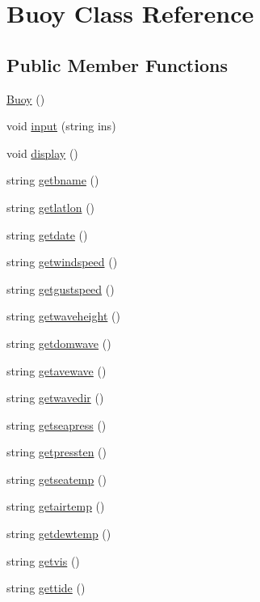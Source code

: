 \hypertarget{class_buoy}{}\section{Buoy Class Reference}
\label{class_buoy}
\subsection*{Public Member Functions}
\begin{DoxyCompactItemize}
\item 
\mbox{\hyperlink{class_buoy_aa6aa319139546405b1590e2ef8a292ae}{Buoy}} ()
\item 
void \mbox{\hyperlink{class_buoy_adebcdc47416100216797efc05dda77a3}{input}} (string ins)
\item 
void \mbox{\hyperlink{class_buoy_a9e5167e5f0967ee99f03ba223236b2d4}{display}} ()
\item 
string \mbox{\hyperlink{class_buoy_a70a9f0c2ed761cb6652de7f5b4d51e8c}{getbname}} ()
\item 
string \mbox{\hyperlink{class_buoy_ace0fbd097bbdd61b32d46e524b93f2eb}{getlatlon}} ()
\item 
string \mbox{\hyperlink{class_buoy_add4f34cc5cf9d4f76e0bef759dddf718}{getdate}} ()
\item 
string \mbox{\hyperlink{class_buoy_a03ceca146a3ccd55a0dfeeda8ae64c9d}{getwindspeed}} ()
\item 
string \mbox{\hyperlink{class_buoy_a9ddb36ab4c43611fc0b863eb0b2df958}{getgustspeed}} ()
\item 
string \mbox{\hyperlink{class_buoy_a94314f54fc596eab0a5cceb72b92725a}{getwaveheight}} ()
\item 
string \mbox{\hyperlink{class_buoy_ae19fe8af463418b675deacedeb7f2747}{getdomwave}} ()
\item 
string \mbox{\hyperlink{class_buoy_a585117182ea30d68098d5b5c0dc7f78c}{getavewave}} ()
\item 
string \mbox{\hyperlink{class_buoy_a665b522593ab478b242dd8a535c9341e}{getwavedir}} ()
\item 
string \mbox{\hyperlink{class_buoy_a487ea32a868903d7239975dd52953c70}{getseapress}} ()
\item 
string \mbox{\hyperlink{class_buoy_ad54dfe539e30d1557b315646e1cb36bd}{getpressten}} ()
\item 
string \mbox{\hyperlink{class_buoy_a72746a5814c47d1d5ec06159cd16fa5e}{getseatemp}} ()
\item 
string \mbox{\hyperlink{class_buoy_a7c7561385cfeb04abb1e40cdf52b9118}{getairtemp}} ()
\item 
string \mbox{\hyperlink{class_buoy_a7b9e88f8edb79946073523fc7acc325c}{getdewtemp}} ()
\item 
string \mbox{\hyperlink{class_buoy_a8688ad14f6a063e07f16e6528f7c759e}{getvis}} ()
\item 
string \mbox{\hyperlink{class_buoy_a4ce29e4567cf7541f078c806c2022c39}{gettide}} ()
\end{DoxyCompactItemize}


